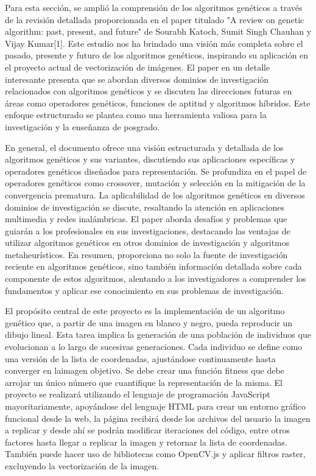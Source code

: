 \documentclass[conference]{IEEEtran}
\begin{document}
Para esta sección, se amplió la comprensión de los algoritmos genéticos a través de la revisión detallada proporcionada en el paper titulado "A review on genetic algorithm: past, present, and future" de Sourabh Katoch, Sumit Singh Chauhan y Vijay Kumar[1]. Este estudio nos ha brindado una visión más completa sobre el pasado, presente y futuro de los algoritmos genéticos, inspirando su aplicación en el proyecto actual de vectorización de imágenes. El paper en un detalle interesante presenta que se abordan diversos dominios de investigación relacionados con algoritmos genéticos y se discuten las direcciones futuras en áreas como operadores genéticos, funciones de aptitud y algoritmos híbridos. Este enfoque estructurado se plantea como una herramienta valiosa para la investigación y la enseñanza de posgrado.

En general, el documento ofrece una visión estructurada y detallada de los algoritmos genéticos y sus variantes, discutiendo sus aplicaciones específicas y operadores genéticos diseñados para representación. Se profundiza en el papel de operadores genéticos como crossover, mutación y selección en la mitigación de la convergencia prematura. La aplicabilidad de los algoritmos genéticos en diversos dominios de investigación se discute, resaltando la atención en aplicaciones multimedia y redes inalámbricas. El paper aborda desafíos y problemas que guiarán a los profesionales en sus investigaciones, destacando las ventajas de utilizar algoritmos genéticos en otros dominios de investigación y algoritmos metaheurísticos. En resumen, proporciona no solo la fuente de investigación reciente en algoritmos genéticos, sino también información detallada sobre cada componente de estos algoritmos, alentando a los investigadores a comprender los fundamentos y aplicar ese conocimiento en sus problemas de investigación.



El propósito central de este proyecto es la implementación de un algoritmo genético que, a partir de una imagen en blanco y negro, pueda reproducir un dibujo lineal. Esta tarea implica la generación de una población de individuos que evolucionan a lo largo de sucesivas generaciones. Cada individuo se define como una versión de la lista de coordenadas, ajustándose continuamente hasta converger en laimagen objetivo. Se debe crear una función fitness que debe arrojar un único número que cuantifique la representación de la misma. 
El proyecto se realizará utilizando el lenguaje de programación JavaScript mayoritariamente, apoyándose del lenguaje HTML para crear un entorno gráfico funcional desde la web, la página recibirá desde los archivos del usuario la imagen a replicar y desde ahí se podrán modificar iteraciones del código, entre otros factores hasta llegar a replicar la imagen y retornar la lista de coordenadas. También puede hacer uso de bibliotecas como OpenCV.js y aplicar filtros raster, excluyendo la vectorización de la imagen. 
\end{document}
